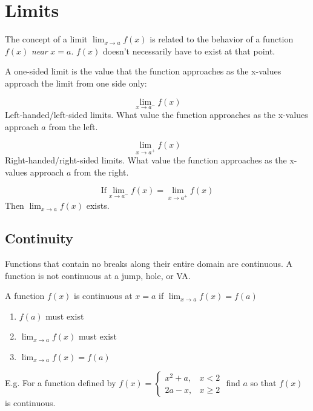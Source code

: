 \documentclass{article}
\begin{document}
\section{Limits}

The concept of a limit $\displaystyle \lim_{x \to a} f(x)$ is related to the behavior of a function $f(x)$ \emph{near} $x=a$. $f(x)$ doesn't necessarily have to exist at that point.

\medskip

\noindent A one-sided limit is the value that the function approaches as the x-values approach the limit from one side only:


\begin{equation*}
    \lim_{x \to a^{-}} f(x)
\end{equation*}
Left-handed/left-sided limits. What value the function approaches as the x-values approach $a$ from the left.

\begin{equation*}
    \lim_{x \to a^{+}} f(x)
\end{equation*}
Right-handed/right-sided limits. What value the function approaches as the x-values approach $a$ from the right.

\begin{equation*}
    \text{If} \lim_{x \to a^{-}} f(x) = \lim_{x \to a^{+}} f(x)
\end{equation*}
Then $\displaystyle \lim_{x \to a} f(x)$ exists.


\subsection{Continuity}

Functions that contain no breaks along their entire domain are continuous. A function is not continuous at a jump, hole, or VA.

\medskip

\noindent A function $f(x)$ is continuous at $x=a$ if $\displaystyle \lim_{x \to a} f(x) = f(a)$

\begin{enumerate}
    \item $f(a)$ must exist
    \item $\displaystyle \lim_{x \to a} f(x)$ must exist
    \item $\displaystyle \lim_{x \to a} f(x) = f(a)$
\end{enumerate}

\bigskip

\noindent E.g. For a function defined by
$f(x) =
    \begin{cases}
        x^{2} + a, & x < 2    \\
        2a - x,    & x \geq 2
    \end{cases}
$
find $a$ so that $f(x)$ is continuous.
\end{document}

